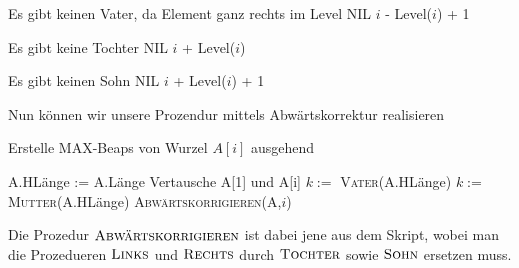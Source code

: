 \begin{solution}
\begin{enumerate}[label = \alph*)]
\phantom{}

    \begin{algorithmic}[1]
            \Comment Es gibt keinen Vater, da Element ganz rechts im Level
                \State \Return NIL
            \Else
                \State \Return $i$ - Level($i$) + 1
            \EndIf
        \EndProcedure
    \end{algorithmic}

\phantom{}

    \begin{algorithmic}[1]
            \Comment Es gibt keine Tochter
                \State \Return NIL
            \Else
                \State \Return $i$ + Level($i$)
            \EndIf
        \EndProcedure
    \end{algorithmic}

\phantom{}

    \begin{algorithmic}[1]
            \Comment Es gibt keinen Sohn
                \State \Return NIL
            \Else
                \State \Return $i$ + Level($i$) + 1
            \EndIf
        \EndProcedure
    \end{algorithmic}


Nun können wir unsere Prozendur mittels Abwärtskorrektur realisieren

\begin{algorithm}
  \caption{Erstelle MAX-Beaps von Wurzel $A[i]$ ausgehend}
  \begin{algorithmic}[1]
          \State A.HLänge := A.Länge
          \State Vertausche A[1] und A[i]
          \State $k :=$ \textsc{Vater}(A.HLänge)
            \State $k :=$ \textsc{Mutter}(A.HLänge)
          \EndIf
              \State \textsc{Abwärtskorrigieren(A,$i$)}
            \EndFor
          \EndIf
      \EndProcedure
  \end{algorithmic}
\end{algorithm}

Die Prozedur $\textsc{Abwärtskorrigieren}$ ist dabei jene aus dem Skript, wobei man die Prozedueren $\textsc{Links}$ und $\textsc{Rechts}$ durch $\textsc{Tochter}$ sowie $\textsc{Sohn}$ ersetzen muss.

\end{enumerate}

\end{solution}
